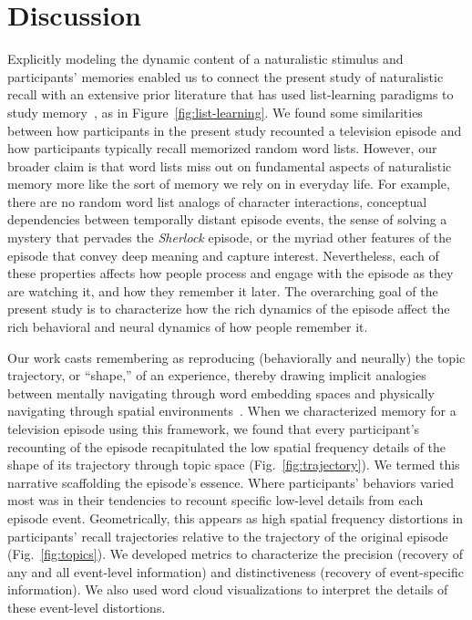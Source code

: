 \documentclass[10pt]{article}
\begin{document}
\section*{Discussion}
\label{sec:discussion}

Explicitly modeling the dynamic content of a naturalistic stimulus and participants' memories enabled us to connect the present study of naturalistic recall with an extensive prior literature that has used list-learning paradigms to study memory~\citep{Kaha12}, as in Figure~\ref{fig:list-learning}.  We found some similarities between how participants in the present study recounted a television episode and how participants typically recall memorized random word lists.  However, our broader claim is that word lists miss out on fundamental aspects of naturalistic memory more like the sort of memory we rely on in everyday life.  For example, there are no random word list analogs of character interactions, conceptual dependencies between temporally distant episode events, the sense of solving a mystery that pervades the \textit{Sherlock} episode, or the myriad other features of the episode that convey deep meaning and capture interest.  Nevertheless, each of these properties affects how people process and engage with the episode as they are watching it, and how they remember it later.  The overarching goal of the present study is to characterize how the rich dynamics of the episode affect the rich behavioral and neural dynamics of how people remember it.

Our work casts remembering as reproducing (behaviorally and neurally) the topic trajectory, or ``shape,'' of an experience, thereby drawing implicit analogies between mentally navigating through word embedding spaces and physically navigating through spatial environments~\citep{BellEtal18, BellEtal20, ConsEtal16}.  When we characterized memory for a television episode using this framework, we found that every participant's recounting of the episode recapitulated the low spatial frequency details of the shape of its trajectory through topic space (Fig.~\ref{fig:trajectory}).  We termed this narrative scaffolding the episode's essence.  Where participants' behaviors varied most was in their tendencies to recount specific low-level details from each episode event.  Geometrically, this appears as high spatial frequency distortions in participants' recall trajectories relative to the trajectory of the original episode (Fig.~\ref{fig:topics}).  We developed metrics to characterize the precision (recovery of any and all event-level information) and distinctiveness (recovery of event-specific information).  We also used word cloud visualizations to interpret the details of these event-level distortions.
\end{document}
